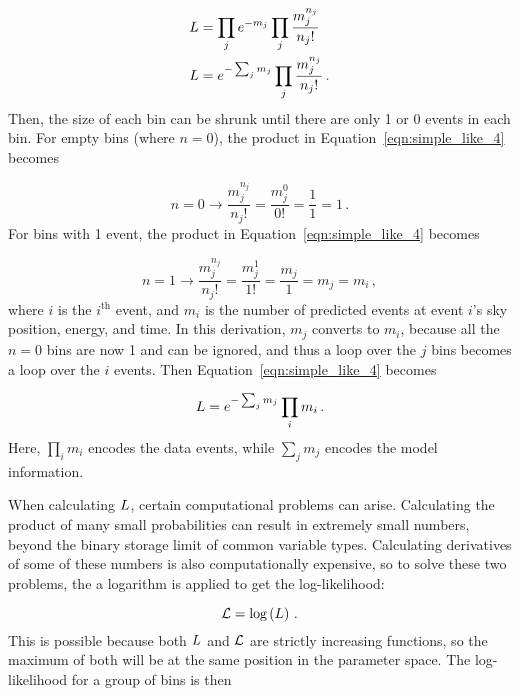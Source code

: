 \begin{equation}\label{eqn:simple_like_4}
  \begin{aligned}
    L &= \prod_j e^{-m_j} \prod_j \frac{m_j^{n_j}}{n_{j}!} \\
    L &= e^{- \sum_j m_j} \prod_j \frac{m_j^{n_j}}{n_{j}!} \,.
  \end{aligned}
\end{equation}
Then, the size of each bin can be shrunk until there are only 1 or 0 events in each bin.
For empty bins (where $n=0$), the product in Equation~\ref{eqn:simple_like_4} becomes

\begin{equation}\label{eqn:simple_like_4a}
  n=0 \rightarrow \frac{m_j^{n_j}}{n_j!} = \frac{m_j^{0}}{0!} = \frac{1}{1} = 1 \,.
\end{equation}
For bins with 1 event, the product in Equation~\ref{eqn:simple_like_4} becomes

\begin{equation}\label{eqn:simple_like_4b}
  n=1 \rightarrow \frac{m_j^{n_j}}{n_j!} = \frac{m_j^1}{1!} = \frac{m_j}{1} = m_j = m_i \,,
\end{equation}
where $i$ is the $i^{\textrm{th}}$ event, and $m_i$ is the number of predicted events at event $i$'s sky position, energy, and time.
In this derivation, $m_j$ converts to $m_i$, because all the $n=0$ bins are now 1 and can be ignored, and thus a loop over the $j$ bins becomes a loop over the $i$ events.
Then Equation~\ref{eqn:simple_like_4} becomes

\begin{equation}\label{eqn:simple_like_5}
  L = e^{- \sum_j m_j} \prod_i m_i \,.
\end{equation}
Here, $\prod_i m_i$ encodes the data events, while $\sum_j m_{j}$ encodes the model information.

When calculating $L$, certain computational problems can arise.
Calculating the product of many small probabilities can result in extremely small numbers, beyond the binary storage limit of common variable types.
Calculating derivatives of some of these numbers is also computationally expensive, so to solve these two problems, the a logarithm is applied to get the log-likelihood:

\begin{equation}\label{eqn:simple_like_6}
  \mathcal{L} = \textrm{log} \left ( L \right )  \,.
\end{equation}
This is possible because both $L$ and $\mathcal{L}$ are strictly increasing functions, so the maximum of both will be at the same position in the parameter space.
The log-likelihood for a group of bins is then

